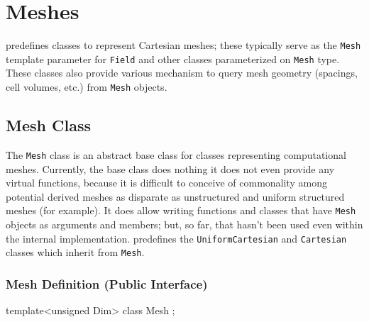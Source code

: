 \chapter{Meshes}
\label{sec:mesh}
\ippl predefines classes to represent Cartesian meshes; these typically serve as the \texttt{Mesh} template parameter for \texttt{Field} 
and other classes parameterized on \texttt{Mesh} type. These classes also provide various mechanism to query mesh 
geometry (spacings, cell volumes, etc.) from \texttt{Mesh} objects. 

\section{Mesh Class} 
The \texttt{Mesh} class is an abstract base class for classes representing computational meshes. 
Currently, the base class does nothing it does not even provide any virtual functions, because it is difficult 
to conceive of commonality among potential derived meshes as disparate as unstructured and uniform structured meshes 
(for example). It does allow writing functions and classes that have \texttt{Mesh} objects as arguments and members; 
but, so far, that hasn't been used even within the
\ippl internal implementation. \ippl predefines the \texttt{UniformCartesian} and \texttt{Cartesian} classes which inherit from \texttt{Mesh}. 

\subsection{Mesh Definition (Public Interface)} 
\begin{smallcode}
template<unsigned Dim> 
class Mesh 
{};
\end{smallcode}

